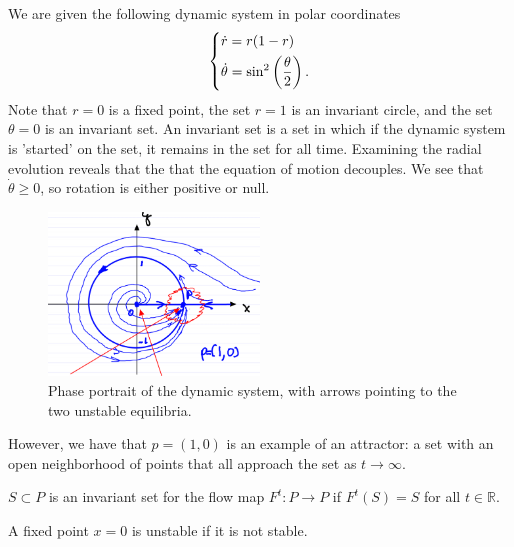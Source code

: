 \begin{ex}[]
	We are given the following dynamic system in polar coordinates
	\begin{align}
		\begin{dcases}
			\dot{r} = r(1-r) \\ \dot{\theta} = \sin^2\left( \frac{\theta}{2} \right).
		\end{dcases}
	\end{align}
	Note that $r=0$ is a fixed point, the set $r=1$ is an invariant circle, and the set $\theta=0$ is an invariant set. An invariant set is a set in which if the dynamic system is 'started' on the set, it remains in the set for all time. Examining the radial evolution reveals that the that the equation of motion decouples. We see that $\dot{\theta}\geq 0$, so rotation is either positive or null.
	\begin{figure}[h]
		\centering
		\includegraphics[width=0.5\textwidth]{figures/ch2/5polar_cds.png}
		\caption{Phase portrait of the dynamic system, with arrows pointing to the two unstable equilibria.}
	\end{figure}

	However, we have that $p=(1,0)$ is an example of an attractor: a set with an open neighborhood of points that all approach the set as $t\to \infty $.	
\end{ex}

\begin{definition}
	$S \subset P$ is an invariant set for the flow map $F^{t}:P \to P$ if $F^{t}(S) =S$ for all $t \in \mathbb{R}$.
\end{definition}

\begin{definition}
	A fixed point $x=0$ is unstable if it is not stable.
\end{definition}

